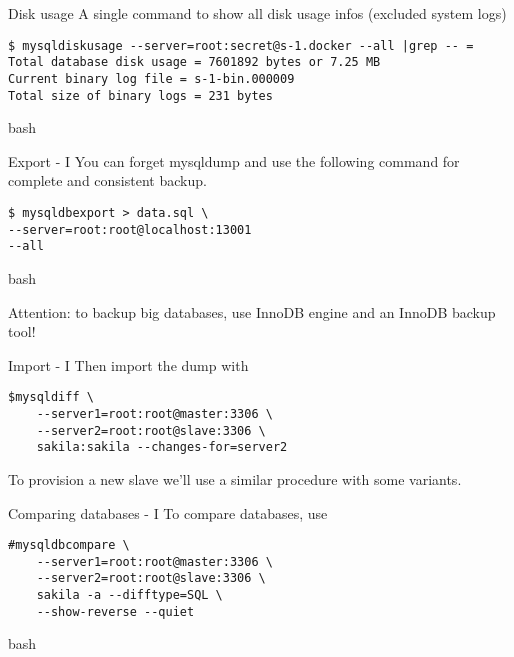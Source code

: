 \documentclass{beamer}[10]
\begin{document}
\iffalse
\begin{pyframe}{Managing binlog}
Managing binlog with \code{mysqlbinlogmove} and
\code{mysqlbinlogpurge}
\end{pyframe}
\fi


\begin{pyframe}{Disk usage}
A single command to show all disk usage infos (excluded system logs)

\begin{verbatim}
$ mysqldiskusage --server=root:secret@s-1.docker --all |grep -- =
Total database disk usage = 7601892 bytes or 7.25 MB
Current binary log file = s-1-bin.000009
Total size of binary logs = 231 bytes
\end{verbatim}{bash}

\end{pyframe}

%
%
\begin{pyframe}{Export - I}
You can forget mysqldump and use the following
command for complete and consistent backup.
\begin{verbatim}
$ mysqldbexport > data.sql \
--server=root:root@localhost:13001
--all
\end{verbatim}{bash}

Attention: to backup big databases, use InnoDB engine
and an InnoDB backup tool!
\end{pyframe}


\begin{pyframe}{Import - I}
Then import the dump with
\begin{verbatim}
$mysqldiff \
    --server1=root:root@master:3306 \
    --server2=root:root@slave:3306 \
    sakila:sakila --changes-for=server2
\end{verbatim}
To provision a new slave we'll use a similar
procedure with some variants.
\end{pyframe}






%
%
\begin{pyframe}{Comparing databases - I}
To compare databases, use
\begin{verbatim}
#mysqldbcompare \
    --server1=root:root@master:3306 \
    --server2=root:root@slave:3306 \
    sakila -a --difftype=SQL \
    --show-reverse --quiet
\end{verbatim}{bash}
\end{pyframe}
\end{document}
